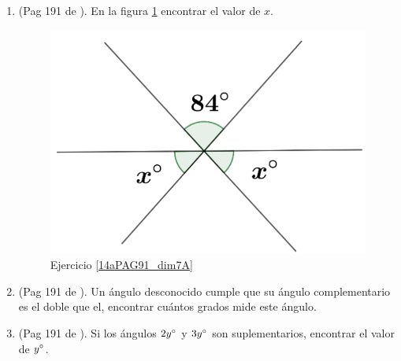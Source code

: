\begin{enumerate}
	\item \label{14aPAG91_dim7A}(Pag 191 de \cite{Dimensions_Math_7A}). En la figura \ref{dimensions_7A_p191_14a} encontrar el valor de $x$.	
	\begin{figure}[H]
		\centering
		\includegraphics[width=0.35\linewidth]{Geometria/imgs/dimensions_7A_p191_14a}
		\caption{Ejercicio \ref{14aPAG91_dim7A}}
		\label{dimensions_7A_p191_14a}
	\end{figure}
	
	\item \label{8PAG91_dim7A}(Pag 191 de \cite{Dimensions_Math_7A}). 	Un ángulo desconocido cumple que su ángulo complementario es el doble que el, encontrar cuántos grados mide este ángulo.
	
	\item \label{9PAG91_dim7A}(Pag 191 de \cite{Dimensions_Math_7A}). 	Si los ángulos $2y\degree$ y $3y\degree$ son suplementarios, encontrar el valor de $y\degree$.
	

\end{enumerate}
